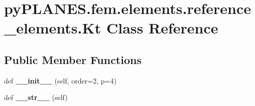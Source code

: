\hypertarget{classpy_p_l_a_n_e_s_1_1fem_1_1elements_1_1reference__elements_1_1_kt}{}\section{py\+P\+L\+A\+N\+E\+S.\+fem.\+elements.\+reference\+\_\+elements.\+Kt Class Reference}
\label{classpy_p_l_a_n_e_s_1_1fem_1_1elements_1_1reference__elements_1_1_kt}
\subsection*{Public Member Functions}
\begin{DoxyCompactItemize}
\item 
\mbox{\label{classpy_p_l_a_n_e_s_1_1fem_1_1elements_1_1reference__elements_1_1_kt_ae6aff9e2f860ac0bcef13cf04d2b42bb}} 
def {\bfseries \+\_\+\+\_\+init\+\_\+\+\_\+} (self, order=2, p=4)
\item 
\mbox{\label{classpy_p_l_a_n_e_s_1_1fem_1_1elements_1_1reference__elements_1_1_kt_ab207b5573d30fb7eb26809fc04cbf181}} 
def {\bfseries \+\_\+\+\_\+str\+\_\+\+\_\+} (self)
\end{DoxyCompactItemize}
